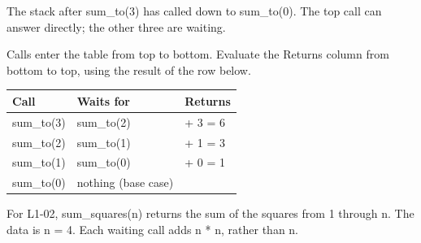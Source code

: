 \documentclass[11pt,a4paper,oneside]{report}
\newcommand{\picturecaption}[1]{\par{\small\color{quiet}#1}\par\medskip}
\begin{document}
\begin{center}\end{center}\picturecaption{The stack after sum\_to(3) has called down to sum\_to(0). The top call can answer directly; the other three are waiting.}
Calls enter the table from top to bottom. Evaluate the Returns column from bottom to top, using the result of the row below.

\par\medskip\begingroup\small\setlength{\tabcolsep}{4pt}\renewcommand{\arraystretch}{1.3}\begin{tabularx}{\linewidth}{>{\raggedright\arraybackslash}X>{\raggedright\arraybackslash}X>{\raggedright\arraybackslash}X}\toprule\textbf{Call} & \textbf{Waits for} & \textbf{Returns}\\\midrule
{}sum\_to(3) & sum\_to(2) & 3 + 3 = 6\\
{}sum\_to(2) & sum\_to(1) & 2 + 1 = 3\\
{}sum\_to(1) & sum\_to(0) & 1 + 0 = 1\\
{}sum\_to(0) & nothing (base case) & 0\\
\bottomrule\end{tabularx}\endgroup\par\medskip
For L1-02, sum\_squares(n) returns the sum of the squares from 1 through n. The data is n = 4. Each waiting call adds n * n, rather than n.
\end{document}
